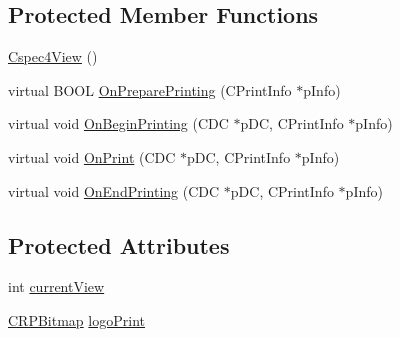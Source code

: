 \subsection*{Protected Member Functions}
\begin{DoxyCompactItemize}
\item 
\hyperlink{classCspec4View_a46a6ea6939661a3536ebd96997b8bbe7}{Cspec4View} ()
\item 
virtual BOOL \hyperlink{classCspec4View_a60895454d64022d163151816049c6f68}{OnPreparePrinting} (CPrintInfo $\ast$pInfo)
\item 
virtual void \hyperlink{classCspec4View_a146d1124b4db40184a743b05011a8208}{OnBeginPrinting} (CDC $\ast$pDC, CPrintInfo $\ast$pInfo)
\item 
virtual void \hyperlink{classCspec4View_a6405840335987b8363fbb9a224918ab0}{OnPrint} (CDC $\ast$pDC, CPrintInfo $\ast$pInfo)
\item 
virtual void \hyperlink{classCspec4View_a5d5816d3e7c541e17b5bd1fb4667fe9a}{OnEndPrinting} (CDC $\ast$pDC, CPrintInfo $\ast$pInfo)
\end{DoxyCompactItemize}
\subsection*{Protected Attributes}
\begin{DoxyCompactItemize}
\item 
int \hyperlink{classCspec4View_ab91f721f64c1b03d9a12046fb2b2c368}{currentView}
\item 
\hyperlink{classCRPBitmap}{CRPBitmap} \hyperlink{classCspec4View_affac048bdbf9a2de632a8d4fe93d5806}{logoPrint}
\end{DoxyCompactItemize}


